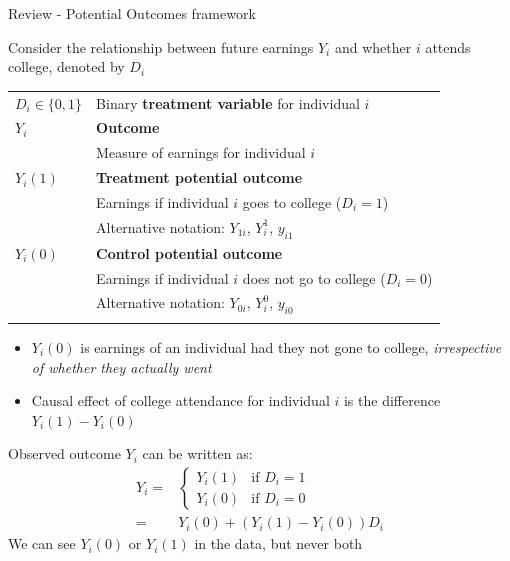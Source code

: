 \documentclass[compress, 8pt]{beamer}
\begin{document}
\begin{frame}{Review - Potential Outcomes framework}

Consider the relationship between future earnings $Y_i$ and whether $i$ attends college, denoted by $D_i$
 
\begin{table}
\begin{tabular}{ll}
$D_i \in \{0, 1\}$ &Binary \textbf{treatment variable} for individual $i$ \\ 
$Y_i$ &\textbf{Outcome} \\
&Measure of earnings for individual $i$\\
\hline
$Y_{i} (1)$ &\textbf{Treatment potential outcome} \\
&Earnings if individual $i$ goes to college ($D_i=1$) \\
&Alternative notation: $Y_{1i}$, $Y_i^1$, $y_{i1}$ \\
\hline
$Y_{i} (0)$ &\textbf{Control potential outcome} \\
&Earnings if individual $i$ does not go to college ($D_i=0$)  \\
&Alternative notation: $Y_{0i}$, $Y_i^0$, $y_{i0}$ \\\\
\end{tabular}
\end{table}

\begin{itemize}
    \item $Y_{i} (0)$ is earnings of an individual had they not gone to college, \emph{irrespective of whether they actually went}
    \item Causal effect of college attendance for individual $i$ is the difference $Y_{i} (1) - Y_{i} (0)$
\end{itemize}

\vspace{2ex}
Observed outcome $Y_i$ can be written as:
\begin{align*}
    Y_i =& \begin{cases}
    Y_{i} (1) &\text{if } D_i = 1 \\
    Y_{i} (0) &\text{if } D_i = 0
    \end{cases} \\
    =& Y_{i} (0) + (Y_{i} (1) - Y_{i} (0)) D_i
\end{align*}
We can see $Y_{i} (0)$ or $Y_{i} (1)$ in the data, but never both
\end{frame}
\end{document}
